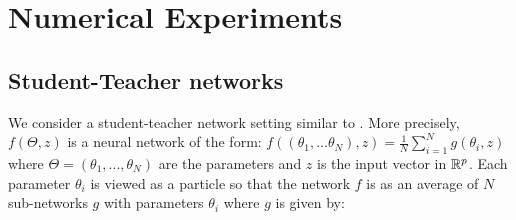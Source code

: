 \section{Numerical Experiments}
\subsection{Student-Teacher networks}\label{sec:experiments}
%
We consider a student-teacher network setting similar to \cite{Chizat:2018a}. More precisely, $f(\Theta,z)$  is a neural network of the form: $f((\theta_1,...\theta_N),z) = \frac{1}{N} \sum_{i=1}^N g(\theta_i,z) $ where $\Theta= (\theta_1,...,\theta_N)$ are the parameters and $z$ is the input vector in ${{\mathbb R}}^{p}$.  Each parameter $\theta_i$ is viewed as a particle so that the network $f$ is as an average of $N$ sub-networks $g$ with parameters $\theta_i$ where $g$ is given by:
